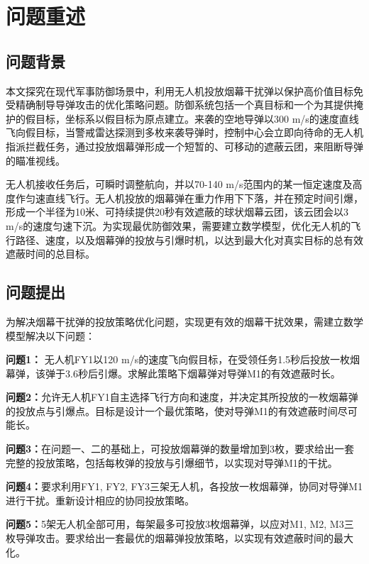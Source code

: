 \documentclass[withoutpreface,bwprint]{cumcmthesis}
\numberwithin{equation}{section} %
\numberwithin{figure}{section} %
\numberwithin{table}{section}  %
\begin{document}
\section{问题重述}
\subsection{问题背景}

本文探究在现代军事防御场景中，利用无人机投放烟幕干扰弹以保护高价值目标免受精确制导导弹攻击的优化策略问题。防御系统包括一个真目标和一个为其提供掩护的假目标，坐标系以假目标为原点建立。来袭的空地导弹以300 m/s的速度直线飞向假目标，当警戒雷达探测到多枚来袭导弹时，控制中心会立即向待命的无人机指派拦截任务，通过投放烟幕弹形成一个短暂的、可移动的遮蔽云团，来阻断导弹的瞄准视线。

无人机接收任务后，可瞬时调整航向，并以70-140 m/s范围内的某一恒定速度及高度作匀速直线飞行。无人机投放的烟幕弹在重力作用下下落，并在预定时间引爆，形成一个半径为10米、可持续提供20秒有效遮蔽的球状烟幕云团，该云团会以3 m/s的速度匀速下沉。为实现最优防御效果，需要建立数学模型，优化无人机的飞行路径、速度，以及烟幕弹的投放与引爆时机，以达到最大化对真实目标的总有效遮蔽时间的总目标。


\vspace{-0.5em}
\subsection{问题提出}

为解决烟幕干扰弹的投放策略优化问题，实现更有效的烟幕干扰效果，需建立数学模型解决以下问题：

\textbf{问题1：} 无人机FY1以120 m/s的速度飞向假目标，在受领任务1.5秒后投放一枚烟幕弹，该弹于3.6秒后引爆。求解此策略下烟幕弹对导弹M1的有效遮蔽时长。

\textbf{问题2：}允许无人机FY1自主选择飞行方向和速度，并决定其所投放的一枚烟幕弹的投放点与引爆点。目标是设计一个最优策略，使对导弹M1的有效遮蔽时间尽可能长。

\textbf{问题3：}在问题一、二的基础上，可投放烟幕弹的数量增加到3枚，要求给出一套完整的投放策略，包括每枚弹的投放与引爆细节，以实现对导弹M1的干扰。

\textbf{问题4：}要求利用FY1, FY2, FY3三架无人机，各投放一枚烟幕弹，协同对导弹M1进行干扰。重新设计相应的协同投放策略。

\textbf{问题5：}5架无人机全部可用，每架最多可投放3枚烟幕弹，以应对M1, M2, M3三枚导弹攻击。要求给出一套最优的烟幕弹投放策略，以实现有效遮蔽时间的最大化。
\vspace{-0.5em}
\end{document}
